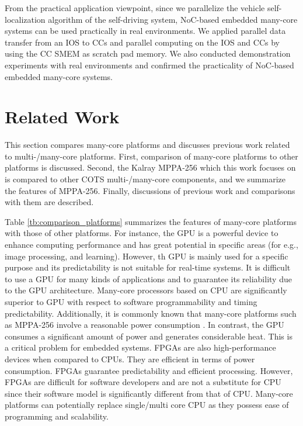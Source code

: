 From the practical application viewpoint, since we parallelize the vehicle self-localization algorithm of the self-driving system, NoC-based embedded many-core systems can be used practically in real environments.
We applied parallel data transfer from an IOS to CCs and parallel computing on the IOS and CCs by using the CC SMEM as scratch pad memory.    
We also conducted demonstration experiments with real environments and confirmed the practicality of NoC-based embedded many-core systems.

\chapter{Related Work}
\label{sec:related_work}
This section compares many-core platforms and discusses previous work related to multi-/many-core platforms.
First, comparison of many-core platforms to other platforms is discussed.
Second, the Kalray MPPA-256 which this work focuses on is compared to other COTS multi-/many-core components, and we summarize the features of MPPA-256.
Finally, discussions of previous work and comparisons with them are described.


Table \ref{tb:comparison_platforms} summarizes the features of many-core platforms with those of other platforms.
For instance, the GPU is a powerful device to enhance computing performance and has great potential in specific areas (for e.g., image processing, and learning).
However, th GPU is mainly used for a specific purpose and its predictability is not suitable for real-time systems.
It is difficult to use a GPU for many kinds of applications and to guarantee its reliability due to the GPU architecture.
Many-core processors based on CPU are significantly superior to GPU with respect to software programmability and timing predictability.
Additionally, it is commonly known that many-core platforms such as MPPA-256 involve a reasonable power consumption \cite{kanter2015kalray}.
In contrast, the GPU consumes a significant amount of power and generates considerable heat.
This is a critical problem for embedded systems.
FPGAs are also high-performance devices when compared to CPUs.
They are efficient in terms of power consumption.
FPGAs guarantee predictability and efficient processing.
However, FPGAs are difficult for software developers and are not a substitute for CPU since their software model is significantly different from that of CPU.
Many-core platforms can potentially replace single/multi core CPU as they possess ease of programming and scalability.

